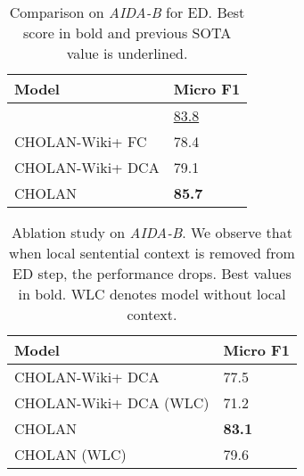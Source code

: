 \documentclass[11pt,a4paper]{article}
\begin{document}
\begin{table}[ht!]
    \centering
    \begin{tabular}{p{3.7cm}p{1.4cm}}
\toprule
     \textbf{Model} & \textbf{Micro F1}\\
\midrule
     \citealt{kolitsas2018end}& \underline{83.8} \\
\midrule
     CHOLAN-Wiki+ FC & 78.4\\
     CHOLAN-Wiki+ DCA& 79.1\\
     CHOLAN & \textbf{85.7} \\
\bottomrule
    \end{tabular}
\caption{Comparison on \textit{AIDA-B} for ED. Best score in bold and previous SOTA value is underlined.}
\label{tab:aidaED}
\vspace{-2mm}
\end{table}


\begin{table}[ht!]
    \centering
    \begin{tabular}{p{4.5cm}p{1.7cm}}
\toprule
     \textbf{Model} & \textbf{Micro F1}\\
\midrule
    CHOLAN-Wiki+ DCA & 77.5\\
    CHOLAN-Wiki+ DCA (WLC) &71.2\\
    CHOLAN  &  \textbf{83.1} \\
    CHOLAN (WLC) & 79.6 \\
\bottomrule
    \end{tabular}
\caption{Ablation study on \textit{AIDA-B}. We observe that when local sentential context is removed from ED step, the performance drops. Best values in bold. WLC denotes model without local context.}
\label{tab:aidacontext}
\vspace{-2mm}
\end{table}
\end{document}
